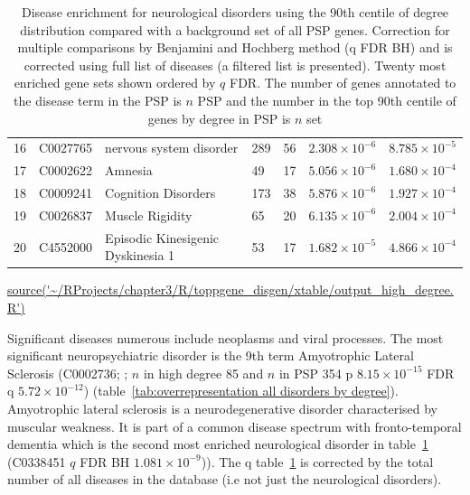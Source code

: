 \begin{table}[ht]
\begin{adjustbox}{width=\textwidth}
\begin{tabular}{lllllll}
  16 & C0027765 & nervous system disorder & 289 & 56 & $2.308 \times 10^{-6}$ & $8.785 \times 10^{-5}$ \\ 
  17 & C0002622 & Amnesia & 49 & 17 & $5.056 \times 10^{-6}$ & $1.680 \times 10^{-4}$ \\ 
  18 & C0009241 & Cognition Disorders & 173 & 38 & $5.876 \times 10^{-6}$ & $1.927 \times 10^{-4}$ \\ 
  19 & C0026837 & Muscle Rigidity & 65 & 20 & $6.135 \times 10^{-6}$ & $2.004 \times 10^{-4}$ \\ 
  20 & C4552000 & Episodic Kinesigenic Dyskinesia 1 & 53 & 17 & $1.682 \times 10^{-5}$ & $4.866 \times 10^{-4}$ \\ 
   \bottomrule
\end{tabular}
\end{adjustbox}
\caption{Disease enrichment for neurological disorders using the 90th centile of degree distribution compared with a background set of all PSP genes. Correction for multiple comparisons by Benjamini and Hochberg method (q FDR BH) and is corrected using full list of diseases (a filtered list is presented). Twenty most enriched gene sets shown ordered by $q$ FDR. The number of genes annotated to the disease term in the PSP is $n$ PSP and the number in the top 90th centile of genes by degree in PSP is $n$ set } 
\tiny\url{source('~/RProjects/chapter3/R/toppgene_disgen/xtable/output_high_degree.R')}
\label{tab:neurological disorders by high degree}
\end{table}




Significant diseases numerous include neoplasms and viral processes. The most significant neuropsychiatric disorder is the 9th term Amyotrophic Lateral Sclerosis  (C0002736;  ; $n$ in high degree 85 and $n$ in PSP 354 p $8.15 \times 10^{-15}$ FDR q $5.72 \times 10^{-12}$) (table~\ref{tab:overrepresentation all disorders by degree}). Amyotrophic lateral sclerosis is a neurodegenerative disorder characterised by muscular weakness. It is part of a common disease spectrum with fronto-temporal dementia  which is the second most enriched neurological disorder in table~\ref{tab:neurological disorders by high degree} (C0338451 $q$ FDR BH $1.081 \times 10^{-9}$)). The q table~\ref{tab:neurological disorders by high degree} is corrected by the total number of all diseases in the database (i.e not just the neurological disorders).

\clearpage





